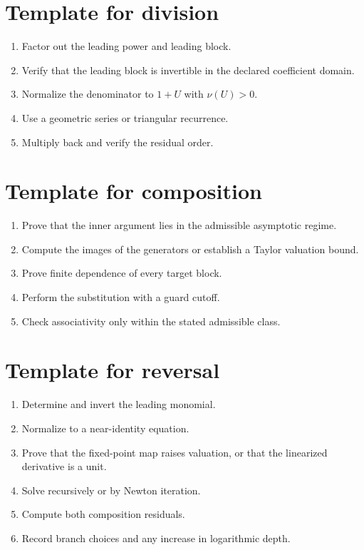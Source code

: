 \documentclass[11pt,openany]{book}
\theoremstyle{definition}
\theoremstyle{plain}
\theoremstyle{remark}
\newcommand{\val}{\nu}
\begin{document}
\section{Template for division}
\begin{enumerate}
\item Factor out the leading power and leading block.
\item Verify that the leading block is invertible in the declared coefficient domain.
\item Normalize the denominator to \(1+U\) with \(\val(U)>0\).
\item Use a geometric series or triangular recurrence.
\item Multiply back and verify the residual order.
\end{enumerate}

\section{Template for composition}
\begin{enumerate}
\item Prove that the inner argument lies in the admissible asymptotic regime.
\item Compute the images of the generators or establish a Taylor valuation bound.
\item Prove finite dependence of every target block.
\item Perform the substitution with a guard cutoff.
\item Check associativity only within the stated admissible class.
\end{enumerate}

\section{Template for reversal}
\begin{enumerate}
\item Determine and invert the leading monomial.
\item Normalize to a near-identity equation.
\item Prove that the fixed-point map raises valuation, or that the linearized derivative is a unit.
\item Solve recursively or by Newton iteration.
\item Compute both composition residuals.
\item Record branch choices and any increase in logarithmic depth.
\end{enumerate}
\end{document}

